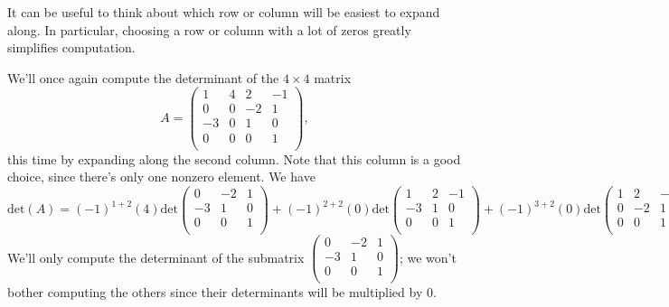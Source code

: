 \documentclass{ximera}
\begin{document}
It can be useful to think about which row or column will be easiest to expand along. In particular, choosing a row or column with a lot of zeros greatly simplifies computation.

\begin{example}
We'll once again compute the determinant of the $4\times 4$ matrix \[
A = \left(\begin{array}{cccc}
1 & 4 & 2 & -1\\
0 & 0 & -2 & 1\\
-3 & 0 & 1 & 0\\
0 & 0 & 0 & 1\\
\end{array}\right),
\]
this time by expanding along the second column. Note that this column is a good choice, since there's only one nonzero element. We have
\[
\textrm{det}(A) = (-1)^{1+2}(4)\textrm{det}\left(\begin{array}{ccc}0&-2&1\\-3&1&0\\0&0&1\\\end{array}\right) + (-1)^{2+2}(0)\textrm{det}\left(\begin{array}{ccc}1&2&-1\\-3&1&0\\0&0&1\\\end{array}\right)+(-1)^{3+2}(0)\textrm{det}\left(\begin{array}{ccc}1&2&-1\\0&-2&1\\0&0&1\\\end{array}\right)+(-1)^{4+2}(0)\textrm{det}\left(\begin{array}{ccc}1&2&-1\\0&-2&1\\-3&1&0\\\end{array}\right).
\]
We'll only compute the determinant of the submatrix $\left(\begin{array}{ccc}0&-2&1\\-3&1&0\\0&0&1\\\end{array}\right)$; we won't bother computing the others since their determinants will be multiplied by $0$. 
\begin{align*}

\end{align*}
\end{example}
\end{document}
